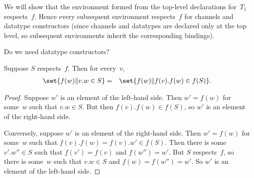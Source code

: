 We will show that the environment formed from the top-level declarations
for~$T_1$ respects~$f$.  Hence every subsequent environment respects~$f$ for
channels and datatype constructors (since channels and datatypes are declared
only at the top level, so subsequent environments inherit the corresponding
bindings).

  Do we need datatype constructors? 


\begin{lemma}
\label{lem:respects}
Suppose $S$ respects~$f$.  Then for every~$v$,
\begin{eqnarray*}
\set{f(w) \| v.w \in S} & = & \set{f(w) \| f(v).f(w) \in f(S)}.
\end{eqnarray*}
\end{lemma}

\begin{proof}
Suppose $w'$ is an element of the left-hand side.
Then $w' = f(w)$ for some~$w$ such that $v.w \in S$.  But then $f(v).f(w) \in
f(S)$, so $w'$ is an element of the right-hand side.

Conversely, suppose $w'$ is an element of the right-hand side.  Then $w' =
f(w)$ for some~$w$ such that $f(v).f(w) = f(v).w' \in f(S)$.  Then there is
some $v'.w'' \in S$ such that $f(v') = f(v)$ and $f(w'') = w'$.  But $S$
respects~$f$, so there is some~$w$ such that $v.w \in S$ and $f(w) = f(w'') =
w'$.  So $w'$ is an element of the left-hand side.
\end{proof}




